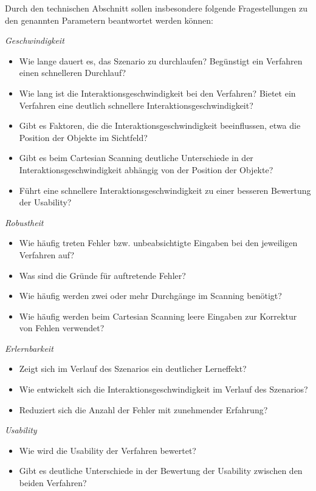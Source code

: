 Durch den technischen Abschnitt sollen insbesondere folgende Fragestellungen zu den genannten Parametern beantwortet werden können:


\textit{Geschwindigkeit} 
    \begin{itemize}
        \item Wie lange dauert es, das Szenario zu durchlaufen? Begünstigt ein Verfahren einen schnelleren Durchlauf?
        \item Wie lang ist die Interaktionsgeschwindigkeit bei den Verfahren? Bietet ein Verfahren eine deutlich schnellere Interaktionsgeschwindigkeit?
        \item Gibt es Faktoren, die die Interaktionsgeschwindigkeit beeinflussen, etwa die Position der Objekte im Sichtfeld?
        \item Gibt es beim Cartesian Scanning deutliche Unterschiede in der Interaktionsgeschwindigkeit abhängig von der Position der Objekte?
        \item Führt eine schnellere Interaktionsgeschwindigkeit zu einer besseren Bewertung der Usability? 
    \end{itemize}
\textit{Robustheit}
    \begin{itemize}
        \item  Wie häufig treten Fehler bzw. unbeabsichtigte Eingaben bei den jeweiligen Verfahren auf? 
        \item Was sind die Gründe für auftretende Fehler?
        \item Wie häufig werden zwei oder mehr Durchgänge im Scanning benötigt?
        \item Wie häufig werden beim Cartesian Scanning leere Eingaben zur Korrektur von Fehlen verwendet? 
    \end{itemize}
\textit{Erlernbarkeit}
    \begin{itemize}
        \item Zeigt sich im Verlauf des Szenarios ein deutlicher Lerneffekt? 
        \item Wie entwickelt sich die Interaktionsgeschwindigkeit im Verlauf des Szenarios? 
        \item Reduziert sich die Anzahl der Fehler mit zunehmender Erfahrung?
    \end{itemize}
\textit{Usability}
    \begin{itemize}
    \item Wie wird die Usability der Verfahren bewertet?
    \item Gibt es deutliche Unterschiede in der Bewertung der Usability zwischen den beiden Verfahren? 
    \end{itemize}


